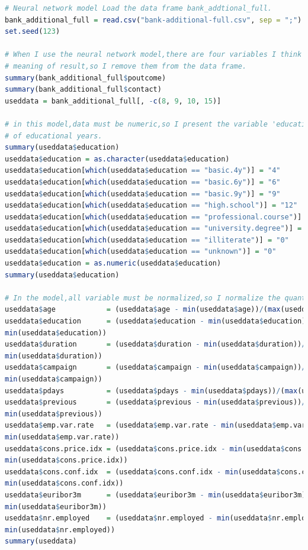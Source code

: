 \documentclass[12pt, a4paper, bibliography=totoc, english]{scrartcl}
\begin{document}
\begin{lstlisting}[language = R]
# Neural network model Load the data frame bank_addtional_full.
bank_additional_full = read.csv("bank-additional-full.csv", sep = ";")
set.seed(123)

# When I use the neural network model,there are four variables I think don't have enough
# meaning of result,so I remove them from the data frame.
summary(bank_additional_full$poutcome)
summary(bank_additional_full$contact)
useddata = bank_additional_full[, -c(8, 9, 10, 15)]

# in this model,data must be numeric,so I present the variable 'education' as the length
# of educational years.
summary(useddata$education)
useddata$education = as.character(useddata$education)
useddata$education[which(useddata$education == "basic.4y")] = "4"
useddata$education[which(useddata$education == "basic.6y")] = "6"
useddata$education[which(useddata$education == "basic.9y")] = "9"
useddata$education[which(useddata$education == "high.school")] = "12"
useddata$education[which(useddata$education == "professional.course")] = "12"
useddata$education[which(useddata$education == "university.degree")] = "16"
useddata$education[which(useddata$education == "illiterate")] = "0"
useddata$education[which(useddata$education == "unknown")] = "0"
useddata$education = as.numeric(useddata$education)
summary(useddata$education)

# In the model,all variable must be normalized,so I normalize the quantitative variable
useddata$age            = (useddata$age - min(useddata$age))/(max(useddata$age) - min(useddata$age))
useddata$education      = (useddata$education - min(useddata$education))/(max(useddata$education) - 
min(useddata$education))
useddata$duration       = (useddata$duration - min(useddata$duration))/(max(useddata$duration) - 
min(useddata$duration))
useddata$campaign       = (useddata$campaign - min(useddata$campaign))/(max(useddata$campaign) - 
min(useddata$campaign))
useddata$pdays          = (useddata$pdays - min(useddata$pdays))/(max(useddata$pdays) - min(useddata$pdays))
useddata$previous       = (useddata$previous - min(useddata$previous))/(max(useddata$previous) - 
min(useddata$previous))
useddata$emp.var.rate   = (useddata$emp.var.rate - min(useddata$emp.var.rate))/(max(useddata$emp.var.rate) - 
min(useddata$emp.var.rate))
useddata$cons.price.idx = (useddata$cons.price.idx - min(useddata$cons.price.idx))/(max(useddata$cons.price.idx) - 
min(useddata$cons.price.idx))
useddata$cons.conf.idx  = (useddata$cons.conf.idx - min(useddata$cons.conf.idx))/(max(useddata$cons.conf.idx) - 
min(useddata$cons.conf.idx))
useddata$euribor3m      = (useddata$euribor3m - min(useddata$euribor3m))/(max(useddata$euribor3m) - 
min(useddata$euribor3m))
useddata$nr.employed    = (useddata$nr.employed - min(useddata$nr.employed))/(max(useddata$nr.employed) - 
min(useddata$nr.employed))
summary(useddata)


\end{lstlisting}
\end{document}
